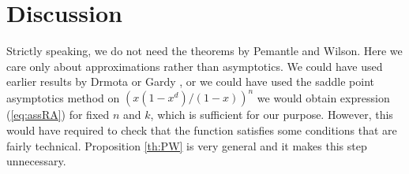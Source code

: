 \documentclass{article}
\begin{document}
\section{Discussion}

Strictly speaking, we do not need the theorems by Pemantle and Wilson.
Here we care only about approximations rather than asymptotics. We could
have used earlier results by Drmota \cite{Drmota1994} or Gardy
\cite{Gardy1995}, or we could have used the saddle point asymptotics
method on $(x(1-x^d)/(1-x))^n$ we would obtain expression (\ref{eq:assRA})
for fixed $n$ and $k$, which is sufficient for our purpose. However, this
would have required to check that the function satisfies some conditions
that are fairly technical. Proposition \ref{th:PW} is very general and it
makes this step unnecessary.





\end{document}
